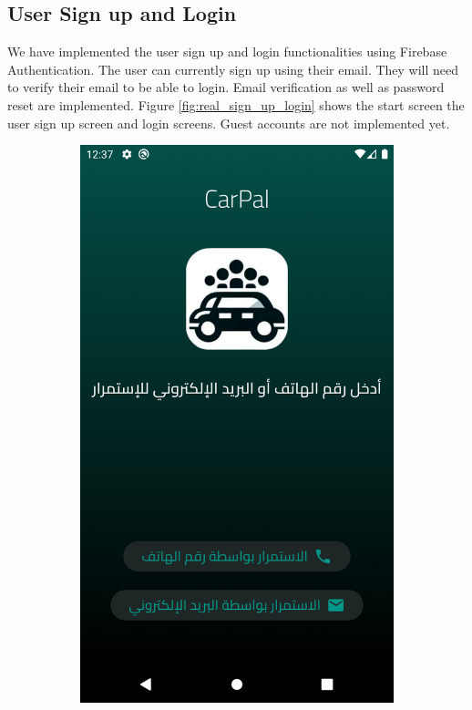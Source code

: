 \documentclass[a4paper, 12pt]{report} %
\begin{document}
    \FloatBarrier
        
        \pagebreak
        \subsection{User Sign up and Login}
            We have implemented the user sign up and login functionalities using Firebase Authentication. The user can currently sign up using their email. They will need to verify their email to be able to login. Email verification as well as password reset are implemented. Figure \ref{fig:real_sign_up_login} shows the start screen the user sign up screen and login screens. Guest accounts are not implemented yet. 
            \begin{figure}[H]
                \centering
                \begin{subfigure}{0.3\textwidth}
                    \includegraphics[width=0.8\linewidth, height=0.9\textheight, keepaspectratio]{Images/first_screen.png}

\end{subfigure}
\end{figure}
\end{document}
